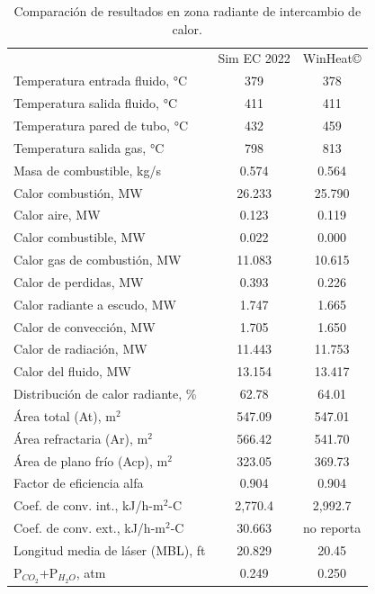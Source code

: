 \begin{table}
\begin{center}
\caption[Resultados en zona radiante de intercambio de calor]{Comparación de resultados en zona radiante de intercambio de calor.}
\label{tbl:compara-zr}
\begin{tabular}{l|c|c}
	& Sim EC 2022 & WinHeat\copyright \\
Temperatura entrada fluido, °C	& 379 & 378	\\
Temperatura salida fluido, °C	& 411 & 411	\\
Temperatura pared de tubo, °C	& 432 & 459	\\
Temperatura salida gas, °C	    & 798 & 813	\\

Masa de combustible, kg/s		& 0.574 & 0.564	\\
Calor combustión, MW			& 26.233 & 25.790	\\
Calor aire, MW					& 0.123 & 0.119	\\
Calor combustible, MW			& 0.022 & 0.000	\\

Calor gas de combustión, MW		& 11.083 & 10.615	\\
Calor de perdidas, MW			& 0.393 & 0.226	\\
Calor radiante a escudo, MW		& 1.747 & 1.665	\\
Calor de convección, MW			& 1.705 & 1.650	\\
Calor de radiación, MW			& 11.443 & 11.753	\\
Calor del fluido, MW			& 13.154 & 13.417	\\

Distribución de calor radiante, \%	& 62.78 & 64.01 \\

Área total (At), m$^2$				& 547.09 & 547.01 \\
Área refractaria (Ar), m$^2$		& 566.42 & 541.70 \\
Área de plano frío (Acp), m$^2$		& 323.05 & 369.73 \\
Factor de eficiencia alfa			& 0.904 & 0.904 \\

Coef. de conv. int., kJ/h-m$^2$-C	& 2,770.4 & 2,992.7 \\
Coef. de conv. ext., kJ/h-m$^2$-C	& 30.663 & no reporta \\

Longitud media de láser (MBL), ft	& 20.829 & 20.45 \\
P$_{CO_2}$+P$_{H_2O}$, atm 		    & 0.249 & 0.250 \\
\end{tabular}
\end{center}
\end{table}

